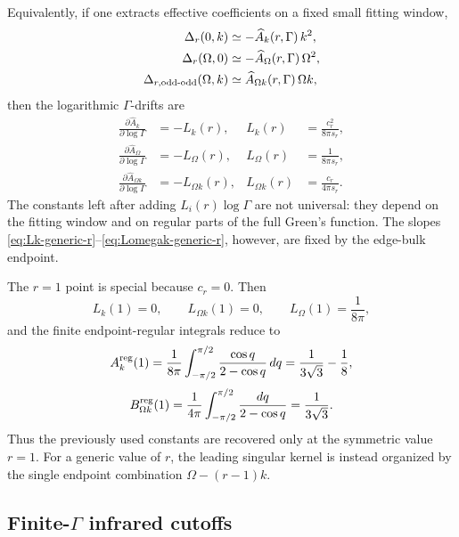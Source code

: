 \documentclass[aps,prx,preprint,amsmath,amssymb]{revtex4-2}
\begin{document}
Equivalently, if one extracts effective coefficients on a fixed small fitting
window,
\begin{align}
\Delta_r(0,k)&\simeq -\widehat A_k(r,\Gamma)\,k^2,
\\
\Delta_r(\Omega,0)&\simeq -\widehat A_\Omega(r,\Gamma)\,\Omega^2,
\\
\Delta_{r,\rm odd\text{-}odd}(\Omega,k)&\simeq
\widehat A_{\Omega k}(r,\Gamma)\,\Omega k,
\end{align}
then the logarithmic \(\Gamma\)-drifts are
\begin{align}
\frac{\partial \widehat A_k}{\partial\log\Gamma}
&=-L_k(r),
&
L_k(r)&=\frac{c_r^2}{8\pi s_r},
\label{eq:Lk-generic-r}
\\
\frac{\partial \widehat A_\Omega}{\partial\log\Gamma}
&=-L_\Omega(r),
&
L_\Omega(r)&=\frac{1}{8\pi s_r},
\label{eq:Lomega-generic-r}
\\
\frac{\partial \widehat A_{\Omega k}}{\partial\log\Gamma}
&=-L_{\Omega k}(r),
&
L_{\Omega k}(r)&=\frac{c_r}{4\pi s_r}.
\label{eq:Lomegak-generic-r}
\end{align}
The constants left after adding \(L_i(r)\log\Gamma\) are not universal: they
depend on the fitting window and on regular parts of the full Green's function.
The slopes \eqref{eq:Lk-generic-r}--\eqref{eq:Lomegak-generic-r}, however, are
fixed by the edge-bulk endpoint.

The \(r=1\) point is special because \(c_r=0\).  Then
\begin{equation}
L_k(1)=0,
\qquad
L_{\Omega k}(1)=0,
\qquad
L_\Omega(1)=\frac{1}{8\pi},
\end{equation}
and the finite endpoint-regular integrals reduce to
\begin{equation}
A_k^{\rm reg}(1)=\frac{1}{8\pi}\int_{-\pi/2}^{\pi/2}
\frac{\cos q}{2-\cos q}\,dq
=
\frac{1}{3\sqrt3}-\frac18,
\end{equation}
\begin{equation}
B_{\Omega k}^{\rm reg}(1)=\frac{1}{4\pi}\int_{-\pi/2}^{\pi/2}
\frac{dq}{2-\cos q}
=
\frac{1}{3\sqrt3}.
\end{equation}
Thus the previously used constants are recovered only at the symmetric value
\(r=1\).  For a generic value of \(r\), the leading singular kernel is instead
organized by the single endpoint combination \(\Omega-(r-1)k\).

\subsection{Finite-\texorpdfstring{$\Gamma$}{Gamma} infrared cutoffs}
\label{subsec:finite-gamma-ir-cutoffs}
\end{document}
